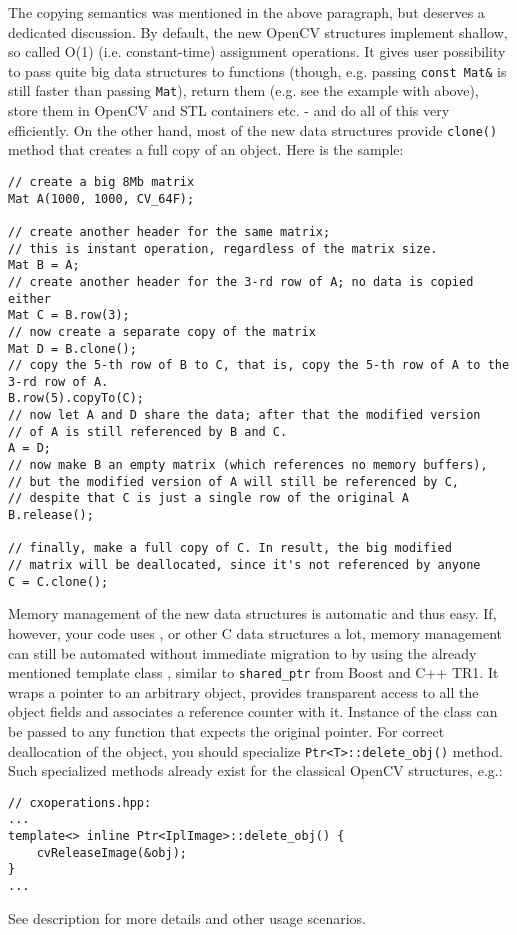 The copying semantics was mentioned in the above paragraph, but deserves a dedicated discussion.
By default, the new OpenCV structures implement shallow, so called O(1) (i.e. constant-time) assignment operations. It gives user possibility to pass quite big data structures to functions (though, e.g. passing \texttt{const Mat\&} is still faster than passing \texttt{Mat}), return them (e.g. see the example with  above), store them in OpenCV and STL containers etc. - and do all of this very efficiently. On the other hand, most of the new data structures provide \texttt{clone()} method that creates a full copy of an object. Here is the sample:
\begin{lstlisting}
// create a big 8Mb matrix
Mat A(1000, 1000, CV_64F);

// create another header for the same matrix;
// this is instant operation, regardless of the matrix size.
Mat B = A;
// create another header for the 3-rd row of A; no data is copied either
Mat C = B.row(3);
// now create a separate copy of the matrix
Mat D = B.clone();
// copy the 5-th row of B to C, that is, copy the 5-th row of A to the 3-rd row of A.
B.row(5).copyTo(C);
// now let A and D share the data; after that the modified version
// of A is still referenced by B and C.
A = D;
// now make B an empty matrix (which references no memory buffers),
// but the modified version of A will still be referenced by C,
// despite that C is just a single row of the original A
B.release(); 
             
// finally, make a full copy of C. In result, the big modified
// matrix will be deallocated, since it's not referenced by anyone
C = C.clone();
\end{lstlisting}

Memory management of the new data structures is automatic and thus easy. If, however, your code uses ,
 or other C data structures a lot, memory management can still be automated without immediate migration
to  by using the already mentioned template class , similar to \texttt{shared\_ptr} from Boost and C++ TR1.
It wraps a pointer to an arbitrary object, provides transparent access to all the object fields and associates a reference counter with it.
Instance of the class can be passed to any function that expects the original pointer. For correct deallocation of the object, you should specialize \texttt{Ptr<T>::delete\_obj()} method. Such specialized methods already exist for the classical OpenCV structures, e.g.:
\begin{lstlisting}
// cxoperations.hpp:
...
template<> inline Ptr<IplImage>::delete_obj() {
    cvReleaseImage(&obj);
}
...
\end{lstlisting}
See  description for more details and other usage scenarios.


